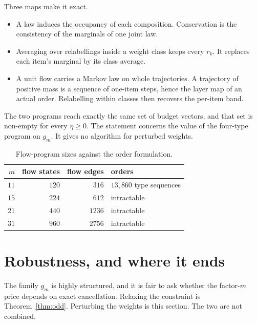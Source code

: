
Three maps make it exact.
\begin{itemize}
\item A law induces the occupancy of each composition. Conservation is the consistency of the
marginals of one joint law.
\item Averaging over relabellings inside a weight class keeps every $r_{k}$. It replaces each
item's marginal by its class average.
\item A unit flow carries a Markov law on whole trajectories. A trajectory of positive mass is
a sequence of one-item steps, hence the layer map of an actual order. Relabelling within
classes then recovers the per-item band.
\end{itemize}
The two programs reach exactly the same set of budget vectors, and that set is non-empty for
every $\eta\ge0$. The statement concerns the value of the four-type program on $g_{m}$. It
gives no algorithm for perturbed weights.

\begin{table}[t]
\caption{Flow-program sizes against the order formulation. \NUM{}}
\label{tab:agree}
\centering
\footnotesize
\begin{tabular}{@{}rrrl@{}}
\toprule
$m$ & flow states & flow edges & orders \\
\midrule
$11$ & $120$ & $316$ & $13{,}860$ type sequences \\
$15$ & $224$ & $612$ & intractable \\
$21$ & $440$ & $1236$ & intractable \\
$31$ & $960$ & $2756$ & intractable \\
\bottomrule
\end{tabular}
\end{table}

\section{Robustness, and where it ends}
\label{sec:robust}

The family $g_{m}$ is highly structured, and it is fair to ask whether the factor-$m$ price
depends on exact cancellation. Relaxing the constraint is Theorem~\ref{thm:odd}. Perturbing
the weights is this section. The two are not combined.

